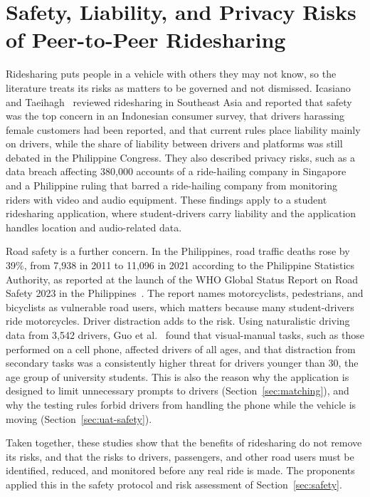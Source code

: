 \section[Safety, Liability, and Privacy Risks of Peer-to-Peer Ridesharing]{Safety, Liability, and Privacy Risks of Peer-to-Peer Ridesharing}\label{sec:lit-risks}
Ridesharing puts people in a vehicle with others they may not know, so the literature treats its risks as matters to be governed and not dismissed. Icasiano and Taeihagh~\cite{icasiano2021governance} reviewed ridesharing in Southeast Asia and reported that safety was the top concern in an Indonesian consumer survey, that drivers harassing female customers had been reported, and that current rules place liability mainly on drivers, while the share of liability between drivers and platforms was still debated in the Philippine Congress. They also described privacy risks, such as a data breach affecting 380,000 accounts of a ride-hailing company in Singapore and a Philippine ruling that barred a ride-hailing company from monitoring riders with video and audio equipment. These findings apply to a student ridesharing application, where student-drivers carry liability and the application handles location and audio-related data.

Road safety is a further concern. In the Philippines, road traffic deaths rose by 39\%, from 7,938 in 2011 to 11,096 in 2021 according to the Philippine Statistics Authority, as reported at the launch of the WHO Global Status Report on Road Safety 2023 in the Philippines~\cite{whoPhRoad2023}. The report names motorcyclists, pedestrians, and bicyclists as vulnerable road users, which matters because many student-drivers ride motorcycles. Driver distraction adds to the risk. Using naturalistic driving data from 3,542 drivers, Guo et al.~\cite{guo2017distraction} found that visual-manual tasks, such as those performed on a cell phone, affected drivers of all ages, and that distraction from secondary tasks was a consistently higher threat for drivers younger than 30, the age group of university students. This is also the reason why the application is designed to limit unnecessary prompts to drivers (Section~\ref{sec:matching}), and why the testing rules forbid drivers from handling the phone while the vehicle is moving (Section~\ref{sec:uat-safety}).

Taken together, these studies show that the benefits of ridesharing do not remove its risks, and that the risks to drivers, passengers, and other road users must be identified, reduced, and monitored before any real ride is made. The proponents applied this in the safety protocol and risk assessment of Section~\ref{sec:safety}.


